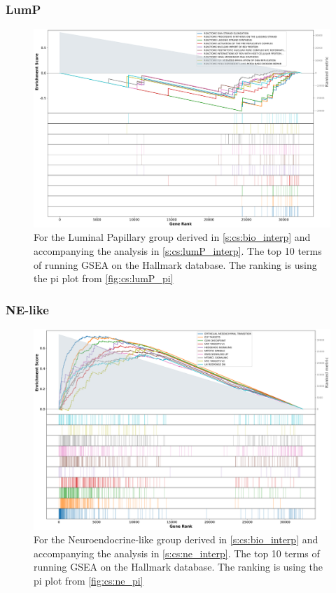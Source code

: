 \subsubsection{LumP}


\begin{figure}[H]    
    \centering
\includegraphics[width=1.0\textwidth,keepaspectratio]{Sections/ClusteringAnalysis/Resources/discussion/other_groups/lumP2_hallmark_10_top.png}
     \caption{For the Luminal Papillary group derived in \cref{s:cs:bio_interp} and accompanying the analysis in \cref{s:cs:lumP_interp}. The top 10 terms of running GSEA on the Hallmark database. The ranking is using the pi plot from \cref{fig:cs:lumP_pi}}
    \label{fig:ap:cs:gsea_lump_hallmark}
\end{figure}


\subsubsection{NE-like}


\begin{figure}[H]    
    \centering
\includegraphics[width=1.0\textwidth,keepaspectratio]{Sections/ClusteringAnalysis/Resources/discussion/other_groups/ne2_hallmark_10_top.png}
     \caption{For the Neuroendocrine-like group derived in \cref{s:cs:bio_interp} and accompanying the analysis in \cref{s:cs:ne_interp}. The top 10 terms of running GSEA on the Hallmark database. The ranking is using the pi plot from \cref{fig:cs:ne_pi}}
    \label{fig:ap:cs:gsea_ne_hallmark}
\end{figure}

